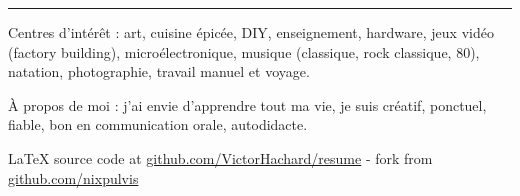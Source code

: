 \documentclass[10pt,letterpaper]{article}
\newcommand{\latex}{\LaTeX\xspace}
\newenvironment{indentsection}[1]
{\begin{list}{}
  {\setlength{\leftmargin}{#1}} \item[]
}
{\end{list}}
\begin{document}
\hrule
\begin{indentsection}{\parindent}
\begin{description*}
\item[Centres d'intérêt :]
  art, cuisine épicée, DIY, enseignement, hardware, jeux vidéo (factory building),
  microélectronique, musique (classique, rock classique, 80), natation, 
  photographie, travail manuel et voyage.
\item[À propos de moi :]
  j'ai envie d'apprendre tout ma vie, je suis créatif, ponctuel, fiable,
  bon en communication orale, autodidacte.
\end{description*}
\end{indentsection}


\begin{center}
\footnotesize \latex source code at
\href{http://www.github.com/VictorHachard/resume}
{github.com/VictorHachard/resume} - fork from
\href{http://www.github.com/nixpulvis}
{github.com/nixpulvis} \\
\end{center}
\end{document}
